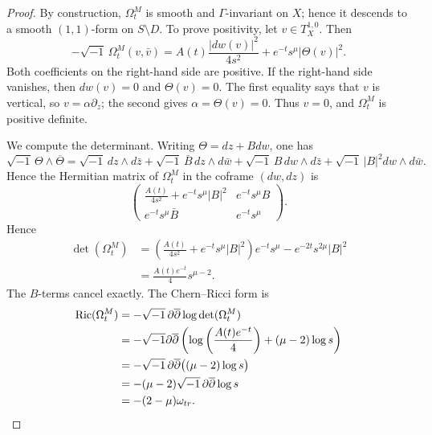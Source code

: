 \documentclass[10pt,a4paper]{amsart}
\numberwithin{equation}{section}
\newcommand{\ddbar}{\sqrt{-1}\,\partial\overline\partial}
\begin{document}
\begin{proof}
By construction, $\Omega_t^M$ is smooth and $\Gamma$-invariant on $X$;
hence it descends to a smooth $(1,1)$-form on $S\setminus D$. To prove positivity, let $v\in T_X^{1,0}$. Then
\begin{equation*}
 -\sqrt{-1}\,\Omega_t^M(v,\bar v)
 =
 A(t)\frac{|dw(v)|^2}{4s^2}
 +
 e^{-t}s^\mu|\Theta(v)|^2.
\end{equation*}
Both coefficients on the right-hand side are positive. If the right-hand side vanishes, then
$dw(v)=0$ and $\Theta(v)=0$. The first equality says that $v$ is
vertical, so $v=\alpha\partial_z$; the second gives
$\alpha=\Theta(v)=0$. Thus $v=0$, and $\Omega_t^M$ is positive definite.

We compute the determinant. Writing $\Theta=dz+Bdw$, one has
$$
\sqrt{-1}\,\Theta\wedge\overline\Theta=\sqrt{-1}\,dz\wedge d\bar z+\sqrt{-1}\,\bar B\,dz\wedge d\bar w+\sqrt{-1}\,B\,dw\wedge d\bar z+\sqrt{-1}\,|B|^2dw\wedge d\bar w.
$$
Hence the Hermitian matrix of $\Omega_t^M$ in the coframe $(dw,dz)$ is
\begin{equation*}
 \begin{pmatrix}
 \displaystyle \frac{A(t)}{4s^2}+e^{-t}s^\mu |B|^2
 &
 \displaystyle e^{-t}s^\mu B
 \\
 \displaystyle e^{-t}s^\mu\bar B
 &
 \displaystyle e^{-t}s^\mu
 \end{pmatrix}.
\end{equation*}
Hence
\begin{align*}
 \det(\Omega_t^M)
 &=
 \left(
 \frac{A(t)}{4s^2}
 +
 e^{-t}s^\mu|B|^2
\right)e^{-t}s^\mu
 -
 e^{-2t}s^{2\mu}|B|^2 \\
 &=
 \frac{A(t)e^{-t}}4s^{\mu-2}.
\end{align*}
The $B$-terms cancel exactly.
The Chern--Ricci form is
\begin{align*}
\operatorname{Ric}(\Omega_t^M)
 &= -\ddbar\log\det(\Omega_t^M) \\
 &= -\sqrt{-1}\partial\overline\partial \left( \log\left(\frac{A(t)e^{-t}}4\right) + (\mu-2)\log s\right) \\
 &= -\ddbar\bigl((\mu-2)\log s\bigr) \\
 &= -(\mu-2)\ddbar\log s \\
 &= -(2-\mu)\omega_{\rm tr}.
\end{align*}


\end{proof}
\end{document}
